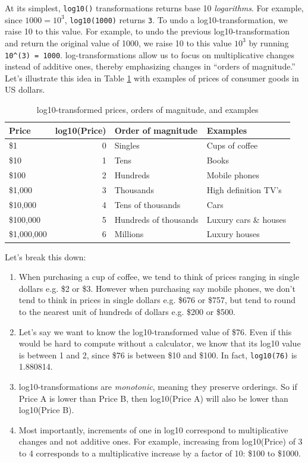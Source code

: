 \documentclass[12pt, krantz2,]{krantz}
\providecommand{\tightlist}{%
  \setlength{\itemsep}{0pt}\setlength{\parskip}{0pt}}
\begin{document}
At its simplest, \texttt{log10()} transformations returns base 10 \emph{logarithms}. For example, since \(1000 = 10^3\), \texttt{log10(1000)} returns \texttt{3}. To undo a log10-transformation, we raise 10 to this value. For example, to undo the previous log10-transformation and return the original value of 1000, we raise 10 to this value \(10^{3}\) by running \texttt{10\^{}(3)\ =\ 1000}. log-transformations allow us to focus on multiplicative changes instead of additive ones, thereby emphasizing changes in ``orders of magnitude.'' Let's illustrate this idea in Table \ref{tab:logten} with examples of prices of consumer goods in US dollars.

\begin{table}[H]

\caption{\label{tab:logten}log10-transformed prices, orders of magnitude, and examples}
\centering
\fontsize{10}{12}\selectfont
\begin{tabular}{lrll}
\toprule
Price & log10(Price) & Order of magnitude & Examples\\
\midrule
\$1 & 0 & Singles & Cups of coffee\\
\$10 & 1 & Tens & Books\\
\$100 & 2 & Hundreds & Mobile phones\\
\$1,000 & 3 & Thousands & High definition TV's\\
\$10,000 & 4 & Tens of thousands & Cars\\
\addlinespace
\$100,000 & 5 & Hundreds of thousands & Luxury cars \& houses\\
\$1,000,000 & 6 & Millions & Luxury houses\\
\bottomrule
\end{tabular}
\end{table}

Let's break this down:

\begin{enumerate}
\def\labelenumi{\arabic{enumi}.}
\tightlist
\item
  When purchasing a cup of coffee, we tend to think of prices ranging in single dollars e.g. \$2 or \$3. However when purchasing say mobile phones, we don't tend to think in prices in single dollars e.g. \$676 or \$757, but tend to round to the nearest unit of hundreds of dollars e.g. \$200 or \$500.
\item
  Let's say we want to know the log10-transformed value of \$76. Even if this would be hard to compute without a calculator, we know that its log10 value is between 1 and 2, since \$76 is between \$10 and \$100. In fact, \texttt{log10(76)} is 1.880814.
\item
  log10-transformations are \emph{monotonic}, meaning they preserve orderings. So if Price A is lower than Price B, then log10(Price A) will also be lower than log10(Price B).
\item
  Most importantly, increments of one in log10 correspond to multiplicative changes and not additive ones. For example, increasing from log10(Price) of 3 to 4 corresponds to a multiplicative increase by a factor of 10: \$100 to \$1000.
\end{enumerate}
\end{document}
